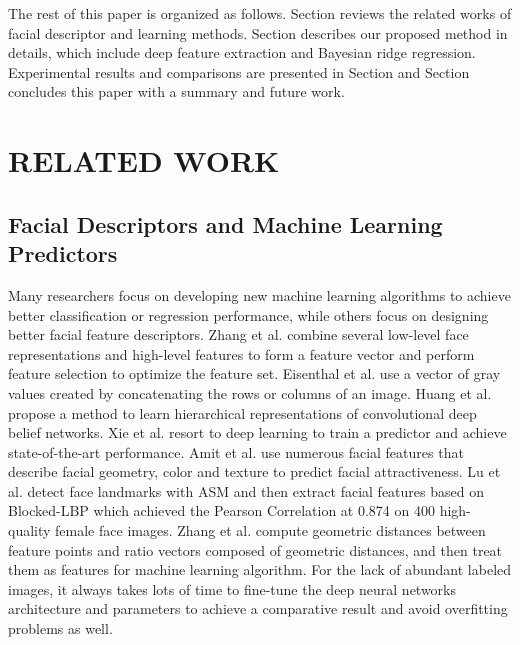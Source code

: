 \documentclass[a4paper,conference]{IEEEtran}
\begin{document}
  The rest of this paper is organized as follows. Section
  \uppercase\expandafter{} reviews the related works of facial descriptor and learning methods.
  Section \uppercase\expandafter{} describes our proposed method
  in details, which include deep feature extraction and Bayesian ridge regression. Experimental
  results and comparisons are presented in Section
  \uppercase\expandafter{} and Section
  \uppercase\expandafter{} concludes this paper with a summary and future work.



\section{RELATED WORK}


  \subsection{Facial Descriptors and Machine Learning Predictors}
    Many researchers focus on developing new machine learning algorithms to
    achieve better classification or regression performance, while others focus
    on designing better facial feature descriptors.
    Zhang et al. \cite{chen2016data} combine several low-level face
    representations and high-level features to form a feature vector and
    perform feature selection to optimize the feature set.
    Eisenthal et al. \cite{eisenthal2006facial} use a vector of gray values
    created by concatenating the rows or columns of an image.
    Huang et al. \cite{huang2012learning} propose a method to learn hierarchical
    representations of convolutional deep belief networks.
    Xie et al. \cite{xie2015scut} resort to deep learning to train a predictor
    and achieve state-of-the-art performance.
    Amit et al. \cite{kagian2007humanlike} use numerous facial features that
    describe facial geometry, color and texture to predict facial attractiveness.
    Lu et al. \cite{Lu2016A} detect face landmarks with ASM and then extract
    facial features based on Blocked-LBP which achieved the Pearson Correlation
    at 0.874 on 400 high-quality female face images.
    Zhang et al. \cite{zhang2011quantitative} compute geometric distances
    between feature points and ratio vectors composed of geometric distances,
    and then treat them as features for machine learning algorithm.
    For the lack of abundant labeled images, it always takes lots of
    time to fine-tune the deep neural networks architecture and parameters to
    achieve a comparative result and avoid overfitting problems as well.
\end{document}
